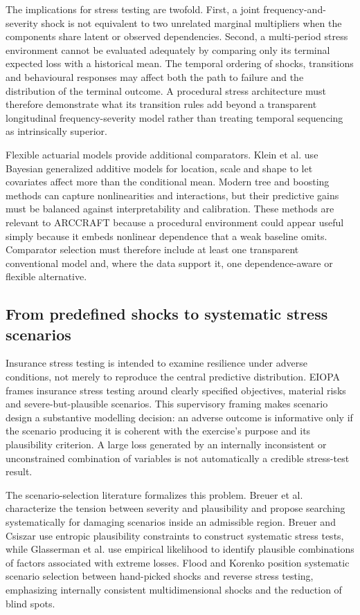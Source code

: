 The implications for stress testing are twofold. First, a joint frequency-and-severity shock is not equivalent to two unrelated marginal multipliers when the components share latent or observed dependencies. Second, a multi-period stress environment cannot be evaluated adequately by comparing only its terminal expected loss with a historical mean. The temporal ordering of shocks, transitions and behavioural responses may affect both the path to failure and the distribution of the terminal outcome. A procedural stress architecture must therefore demonstrate what its transition rules add beyond a transparent longitudinal frequency-severity model rather than treating temporal sequencing as intrinsically superior.

Flexible actuarial models provide additional comparators. Klein et al. \cite{Klein2014} use Bayesian generalized additive models for location, scale and shape to let covariates affect more than the conditional mean. Modern tree and boosting methods can capture nonlinearities and interactions, but their predictive gains must be balanced against interpretability and calibration. These methods are relevant to ARCCRAFT because a procedural environment could appear useful simply because it embeds nonlinear dependence that a weak baseline omits. Comparator selection must therefore include at least one transparent conventional model and, where the data support it, one dependence-aware or flexible alternative.

\subsection{From predefined shocks to systematic stress scenarios}\label{sec:from-predefined-shocks-to-systematic-stress-scenarios}

Insurance stress testing is intended to examine resilience under adverse conditions, not merely to reproduce the central predictive distribution. EIOPA \cite{EIOPA2020} frames insurance stress testing around clearly specified objectives, material risks and severe-but-plausible scenarios. This supervisory framing makes scenario design a substantive modelling decision: an adverse outcome is informative only if the scenario producing it is coherent with the exercise's purpose and its plausibility criterion. A large loss generated by an internally inconsistent or unconstrained combination of variables is not automatically a credible stress-test result.

The scenario-selection literature formalizes this problem. Breuer et al. \cite{Breuer2009} characterize the tension between severity and plausibility and propose searching systematically for damaging scenarios inside an admissible region. Breuer and Csiszar \cite{Breuer2013} use entropic plausibility constraints to construct systematic stress tests, while Glasserman et al. \cite{Glasserman2015} use empirical likelihood to identify plausible combinations of factors associated with extreme losses. Flood and Korenko \cite{Flood2015} position systematic scenario selection between hand-picked shocks and reverse stress testing, emphasizing internally consistent multidimensional shocks and the reduction of blind spots.

